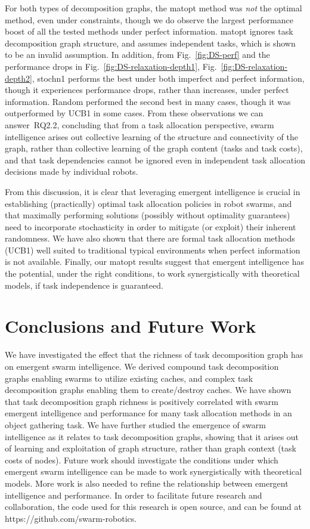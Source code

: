 For both types of decomposition graphs, the \gls{matopt} method was \emph{not}
the optimal method, even under constraints, though we do observe the largest
performance boost of all the tested methods under perfect
information. \gls{matopt} ignores task decomposition graph structure, and
assumes independent tasks, which is shown to be an invalid assumption. In
addition, from Fig.~\ref{fig:DS-perf} and the performance drops in
Fig.~\ref{fig:DS-relaxation-depth1}, Fig.~\ref{fig:DS-relaxation-depth2},
\gls{stochn1} performs the best under both imperfect and perfect information,
though it experiences performance drops, rather than increases, under perfect
information. Random performed the second best in many cases, though it was
outperformed by UCB1 in some cases. From these observations we can
answer~\gls{RQ2.2}, concluding that from a task allocation perspective, swarm
intelligence arises out collective learning of the structure and connectivity of
the graph, rather than collective learning of the graph content (tasks and task
costs), and that task dependencies cannot be ignored even in independent task
allocation decisions made by individual robots.

From this discussion, it is clear that leveraging emergent intelligence is crucial in
establishing (practically) optimal task allocation policies in robot swarms, and that
maximally performing solutions (possibly without optimality guarantees) need to
incorporate stochasticity in order to mitigate (or exploit) their inherent
randomness. We have also shown that there are formal task allocation methods (UCB1)
well suited to traditional typical environments when perfect information is not
available. Finally, our \gls{matopt} results suggest that emergent intelligence has the
potential, under the right conditions, to work synergistically with theoretical
models, if task independence is guaranteed.
%
\section{Conclusions and Future Work}\label{sec:conclusions}
%
We have investigated the effect that the richness of task decomposition graph has on
emergent swarm intelligence. We derived compound task decomposition graphs enabling
swarms to utilize existing caches, and complex task decomposition graphs enabling
them to create/destroy caches. We have shown that task decomposition graph richness
is positively correlated with swarm emergent intelligence and performance for many
task allocation methods in an object gathering task. We have further studied the
emergence of swarm intelligence as it relates to task decomposition graphs, showing
that it arises out of learning and exploitation of graph structure, rather than graph
context (task costs of nodes). Future work should investigate the conditions under
which emergent swarm intelligence can be made to work synergistically with
theoretical models. More work is also needed to refine the relationship between
emergent intelligence and performance. In order to facilitate future research and
collaboration, the code used for this research is open source, and can be found at
https://github.com/swarm-robotics.

